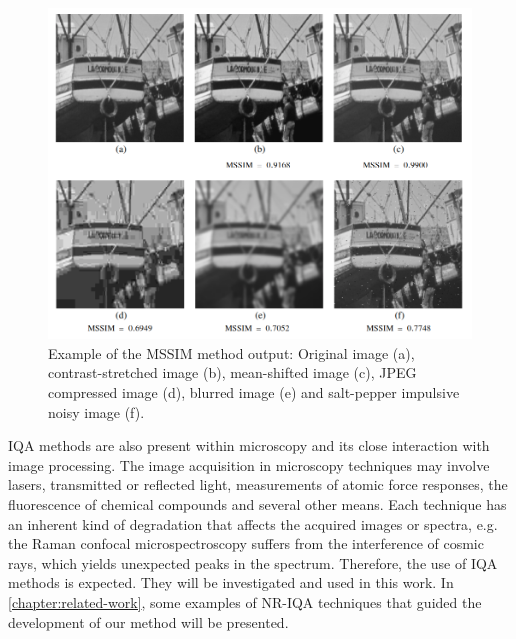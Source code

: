 \begin{figure}[ht]
	\centering
	\caption{\label{fig:mssim_IQA_exampe} Example of the MSSIM method output: Original image (a), contrast-stretched image (b), mean-shifted image (c), JPEG compressed image (d), blurred image (e) and salt-pepper impulsive noisy image (f).}
	\begin{center}
    \includegraphics[scale=0.4]{images/mssim_IQA.png}
	\end{center}
	\centering
\end{figure}

IQA methods are also present within microscopy and its close interaction with image processing. The image acquisition in microscopy techniques may involve lasers, transmitted or reflected light, measurements of atomic force responses, the fluorescence of chemical compounds and several other means. Each technique has an inherent kind of degradation that affects the acquired images or spectra, e.g. the Raman confocal microspectroscopy suffers from the interference of cosmic rays, which yields unexpected peaks in the spectrum. Therefore, the use of IQA methods is expected. They will be investigated and used in this work. In \autoref{chapter:related-work}, some examples of NR-IQA techniques that guided the development of our method will be presented.